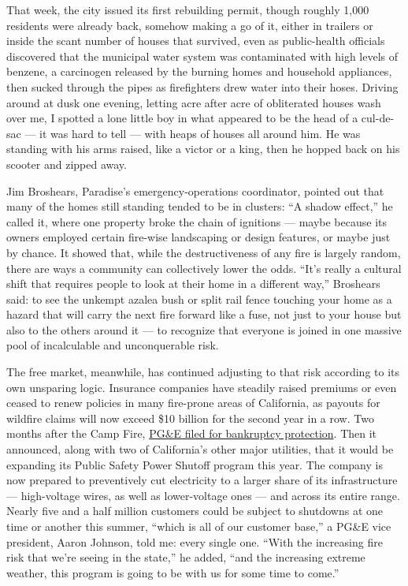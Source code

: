 That week, the city issued its first rebuilding permit, though roughly
1,000 residents were already back, somehow making a go of it, either in
trailers or inside the scant number of houses that survived, even as
public-health officials discovered that the municipal water system was
contaminated with high levels of benzene, a carcinogen released by the
burning homes and household appliances, then sucked through the pipes as
firefighters drew water into their hoses. Driving around at dusk one
evening, letting acre after acre of obliterated houses wash over me, I
spotted a lone little boy in what appeared to be the head of a
cul-de-sac --- it was hard to tell --- with heaps of houses all around
him. He was standing with his arms raised, like a victor or a king, then
he hopped back on his scooter and zipped away.

Jim Broshears, Paradise's emergency-operations coordinator, pointed out
that many of the homes still standing tended to be in clusters: ``A
shadow effect,'' he called it, where one property broke the chain of
ignitions --- maybe because its owners employed certain fire-wise
landscaping or design features, or maybe just by chance. It showed that,
while the destructiveness of any fire is largely random, there are ways
a community can collectively lower the odds. ``It's really a cultural
shift that requires people to look at their home in a different way,''
Broshears said: to see the unkempt azalea bush or split rail fence
touching your home as a hazard that will carry the next fire forward
like a fuse, not just to your house but also to the others around it ---
to recognize that everyone is joined in one massive pool of incalculable
and unconquerable risk.

The free market, meanwhile, has continued adjusting to that risk
according to its own unsparing logic. Insurance companies have steadily
raised premiums or even ceased to renew policies in many fire-prone
areas of California, as payouts for wildfire claims will now exceed \$10
billion for the second year in a row. Two months after the Camp Fire,
\href{https://www.nytimes3xbfgragh.onion/2019/07/11/business/energy-environment/wildfire-california-utilities.html}{PG\&E
filed for bankruptcy protection}. Then it announced, along with two of
California's other major utilities, that it would be expanding its
Public Safety Power Shutoff program this year. The company is now
prepared to preventively cut electricity to a larger share of its
infrastructure --- high-voltage wires, as well as lower-voltage ones ---
and across its entire range. Nearly five and a half million customers
could be subject to shutdowns at one time or another this summer,
``which is all of our customer base,'' a PG\&E vice president, Aaron
Johnson, told me: every single one. ``With the increasing fire risk that
we're seeing in the state,'' he added, ``and the increasing extreme
weather, this program is going to be with us for some time to come.''

